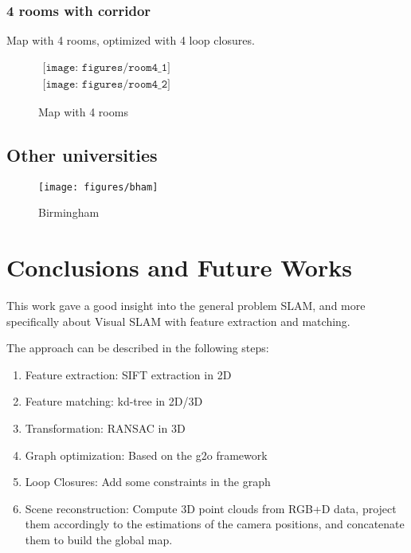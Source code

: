 \clearpage

\subsection{4 rooms with corridor}
Map with 4 rooms, optimized with 4 loop closures.

\begin{figure}[h]
\centering$
\begin{array}{c}
\texttt{[image: figures/room4\_1]}\\
\texttt{[image: figures/room4\_2]}
\end{array}$
\caption{Map with 4 rooms}
\end{figure}

\clearpage

\section{Other universities}

\begin{figure}[h]
\centering
\texttt{[image: figures/bham]}
\caption{Birmingham}
\end{figure}

\chapter{Conclusions and Future Works}
\label{chap:conclusion}

This work gave a good insight into the general problem SLAM, and more specifically about Visual SLAM with feature extraction and matching.

The approach can be described in the following steps:
\begin{enumerate}
\item Feature extraction: SIFT extraction in 2D
\item Feature matching: kd-tree in 2D/3D
\item Transformation: RANSAC in 3D
\item Graph optimization: Based on the g2o framework
\item Loop Closures: Add some constraints in the graph
\item Scene reconstruction: Compute 3D point clouds from RGB+D data, project them accordingly to the estimations of the camera positions, and concatenate them to build the global map.
\end{enumerate}


